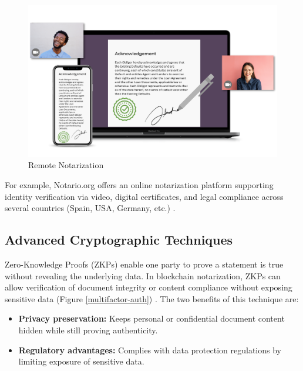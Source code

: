 \begin{figure}[H]
    \centering
    \includegraphics[width=18cm]{"images/remote-notarization.png"}
    \caption{Remote Notarization}
    \label{remote-notarization}
\end{figure}

For example, Notario.org offers an online notarization platform supporting identity verification via video, digital certificates, and legal compliance across several countries (Spain, USA, Germany, etc.) \cite{wikipedia_notario_nodate}.

\subsection{Advanced Cryptographic Techniques}
Zero-Knowledge Proofs (ZKPs) enable one party to prove a statement is true without revealing the underlying data. In blockchain notarization, ZKPs can allow verification of document integrity or content compliance without exposing sensitive data (Figure \ref{multifactor-auth}) \cite{wikipedia_privacy_nodate}. The two benefits of this technique are:

\begin{itemize}
    \item \textbf{Privacy preservation:} Keeps personal or confidential document content hidden while still proving authenticity.
    \item \textbf{Regulatory advantages:} Complies with data protection regulations by limiting exposure of sensitive data.
\end{itemize}

